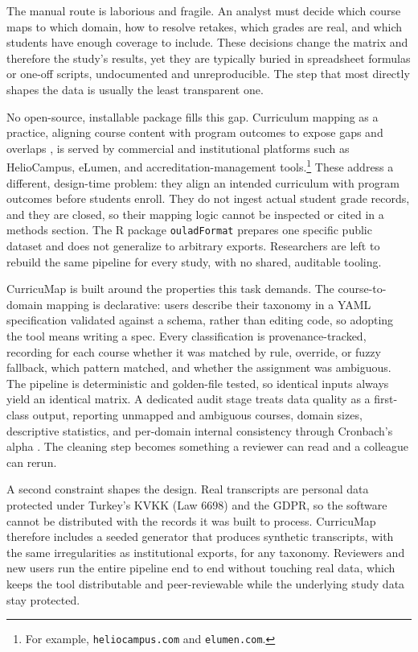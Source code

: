 \documentclass[11pt]{article}
\begin{document}
The manual route is laborious and fragile. An analyst must decide which course maps to which domain, how to resolve retakes, which grades are real, and which students have enough coverage to include. These decisions change the matrix and therefore the study's results, yet they are typically buried in spreadsheet formulas or one-off scripts, undocumented and unreproducible. The step that most directly shapes the data is usually the least transparent one.

No open-source, installable package fills this gap. Curriculum mapping as a practice, aligning course content with program outcomes to expose gaps and overlaps \cite{smith2024}, is served by commercial and institutional platforms such as HelioCampus, eLumen, and accreditation-management tools.\footnote{For example, \texttt{heliocampus.com} and \texttt{elumen.com}.} These address a different, design-time problem: they align an intended curriculum with program outcomes before students enroll. They do not ingest actual student grade records, and they are closed, so their mapping logic cannot be inspected or cited in a methods section. The R package \texttt{ouladFormat} \cite{howard2025} prepares one specific public dataset and does not generalize to arbitrary exports. Researchers are left to rebuild the same pipeline for every study, with no shared, auditable tooling.

CurricuMap is built around the properties this task demands. The course-to-domain mapping is declarative: users describe their taxonomy in a YAML specification validated against a schema, rather than editing code, so adopting the tool means writing a spec. Every classification is provenance-tracked, recording for each course whether it was matched by rule, override, or fuzzy fallback, which pattern matched, and whether the assignment was ambiguous. The pipeline is deterministic and golden-file tested, so identical inputs always yield an identical matrix. A dedicated audit stage treats data quality as a first-class output, reporting unmapped and ambiguous courses, domain sizes, descriptive statistics, and per-domain internal consistency through Cronbach's alpha \cite{cronbach1951}. The cleaning step becomes something a reviewer can read and a colleague can rerun.

A second constraint shapes the design. Real transcripts are personal data protected under Turkey's KVKK (Law 6698) \cite{kvkk} and the GDPR, so the software cannot be distributed with the records it was built to process. CurricuMap therefore includes a seeded generator that produces synthetic transcripts, with the same irregularities as institutional exports, for any taxonomy. Reviewers and new users run the entire pipeline end to end without touching real data, which keeps the tool distributable and peer-reviewable while the underlying study data stay protected.
\end{document}
